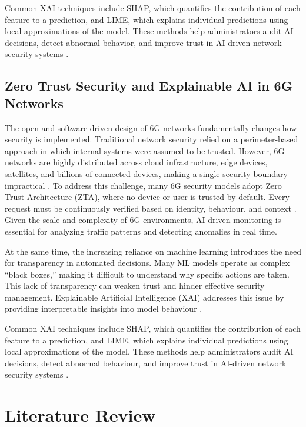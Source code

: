 \documentclass[letterpaper]{article} %
\begin{document}
Common XAI techniques include SHAP, which quantifies the contribution of each feature to a prediction, and LIME, which explains individual predictions using local approximations of the model. These methods help administrators audit AI decisions, detect abnormal behavior, and improve trust in AI-driven network security systems \cite{kaur2025}.


\subsection{Zero Trust Security and Explainable AI in 6G Networks}

The open and software-driven design of 6G networks fundamentally changes how security is implemented. Traditional network security relied on a perimeter-based approach in which internal systems were assumed to be trusted. However, 6G networks are highly distributed across cloud infrastructure, edge devices, satellites, and billions of connected devices, making a single security boundary impractical \cite{kaur2025} .
To address this challenge, many 6G security models adopt Zero Trust Architecture (ZTA), where no device or user is trusted by default. Every request must be continuously verified based on identity, behaviour, and context \cite{kaur2025} . Given the scale and complexity of 6G environments, AI-driven monitoring is essential for analyzing traffic patterns and detecting anomalies in real time.

At the same time, the increasing reliance on machine learning introduces the need for transparency in automated decisions. Many ML models operate as complex “black boxes,” making it difficult to understand why specific actions are taken. This lack of transparency can weaken trust and hinder effective security management. Explainable Artificial Intelligence (XAI) addresses this issue by providing interpretable insights into model behaviour \cite{kaur2025} .

Common XAI techniques include SHAP, which quantifies the contribution of each feature to a prediction, and LIME, which explains individual predictions using local approximations of the model. These methods help administrators audit AI decisions, detect abnormal behaviour, and improve trust in AI-driven network security systems \cite{kaur2025}.

\section{Literature Review}
\end{document}
